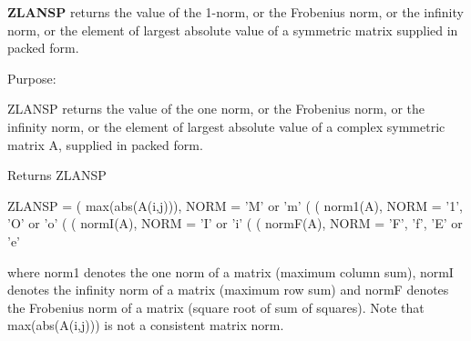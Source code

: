 {\bfseries Z\+L\+A\+N\+S\+P} returns the value of the 1-\/norm, or the Frobenius norm, or the infinity norm, or the element of largest absolute value of a symmetric matrix supplied in packed form. 

 \begin{DoxyParagraph}{Purpose\+: }
\begin{DoxyVerb} ZLANSP  returns the value of the one norm,  or the Frobenius norm, or
 the  infinity norm,  or the  element of  largest absolute value  of a
 complex symmetric matrix A,  supplied in packed form.\end{DoxyVerb}

\end{DoxyParagraph}
\begin{DoxyReturn}{Returns}
Z\+L\+A\+N\+S\+P \begin{DoxyVerb}    ZLANSP = ( max(abs(A(i,j))), NORM = 'M' or 'm'
             (
             ( norm1(A),         NORM = '1', 'O' or 'o'
             (
             ( normI(A),         NORM = 'I' or 'i'
             (
             ( normF(A),         NORM = 'F', 'f', 'E' or 'e'

 where  norm1  denotes the  one norm of a matrix (maximum column sum),
 normI  denotes the  infinity norm  of a matrix  (maximum row sum) and
 normF  denotes the  Frobenius norm of a matrix (square root of sum of
 squares).  Note that  max(abs(A(i,j)))  is not a consistent matrix norm.\end{DoxyVerb}
 
\end{DoxyReturn}

